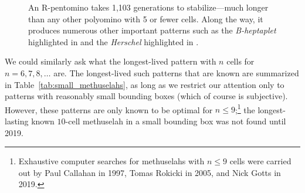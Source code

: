 \begin{figure}[!htb]
	\centering{}
	\caption{An R-pentomino takes 1,103 generations to stabilize---much longer than any other polyomino with 5 or fewer cells. Along the way, it produces numerous other important patterns such as the \emph{B-heptaplet} highlighted in  and the \emph{Herschel} highlighted in .}\label{fig:r_pentomino}
\end{figure}

We could similarly ask what the longest-lived pattern with $n$ cells for $n = 6, 7, 8, \ldots$ are. The longest-lived such patterns that are known are summarized in Table~\ref{tab:small_methuselahs}, as long as we restrict our attention only to patterns with reasonably small bounding boxes (which of course is subjective). However, these patterns are only known to be optimal for $n \leq 9$;\footnote{Exhaustive computer searches for methuselahs with $n \leq 9$ cells were carried out by Paul Callahan in 1997, Tomas Rokicki in 2005, and Nick Gotts in 2019.} the longest-lasting known $10$-cell methuselah in a small bounding box was not found until 2019.

